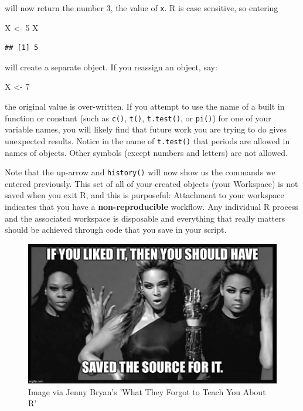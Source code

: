 \documentclass[
]{book}
\newenvironment{Shaded}{\begin{snugshade}}{\end{snugshade}}
\newcommand{\DecValTok}[1]{\textcolor[rgb]{0.00,0.00,0.81}{#1}}
\newcommand{\NormalTok}[1]{#1}
\newcommand{\OtherTok}[1]{\textcolor[rgb]{0.56,0.35,0.01}{#1}}
\begin{document}
will now return the number 3, the value of \texttt{x}. R is case sensitive, so entering

\begin{Shaded}
\begin{Highlighting}[]
\NormalTok{X }\OtherTok{\textless{}{-}} \DecValTok{5}
\NormalTok{X}
\end{Highlighting}
\end{Shaded}

\begin{verbatim}
## [1] 5
\end{verbatim}

will create a separate object. If you reassign an object, say:

\begin{Shaded}
\begin{Highlighting}[]
\NormalTok{X }\OtherTok{\textless{}{-}} \DecValTok{7}
\end{Highlighting}
\end{Shaded}

the original value is over-written. If you attempt to use the name of a built in function or constant (such as \texttt{c()}, \texttt{t()}, \texttt{t.test()}, or \texttt{pi()}) for one of your variable names, you will likely find that future work you are trying to do gives unexpected results. Notice in the name of \texttt{t.test()} that periods are allowed in names of objects. Other symbols (except numbers and letters) are not allowed.

Note that the up-arrow and \texttt{history()} will now show us the commands we entered previously. This set of all of your created objects (your Workspace) is not saved when you exit R, and this is purposeful: Attachment to your workspace indicates that you have a \textbf{non-reproducible} workflow. Any individual R process and the associated workspace is disposable and everything that really matters should be achieved through code that you save in your script.

\begin{figure}
\includegraphics[width=12.33in]{img/if-you-liked-it-you-should-have-saved-the-source-for-it} \caption{ Image via Jenny Bryan's 'What They Forgot to Teach You About R'}\label{fig:unnamed-chunk-8}
\end{figure}
\end{document}
